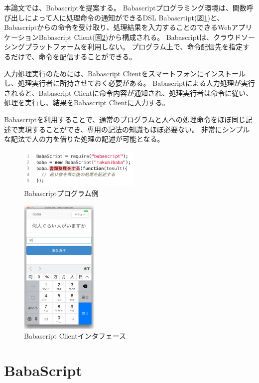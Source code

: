 本論文では、Babascriptを提案する。
Babascriptプログラミング環境は、関数呼び出しによって人に処理命令の通知ができるDSL
Babascrtipt(図\ref{script_01})と、
Babascriptからの命令を受け取り、処理結果を入力することのできるWebアプリケーションBabascript
Client(図\ref{webapp-interface})から構成される。
Babascriptは、クラウドソーシングプラットフォームを利用しない。
プログラム上で、命令配信先を指定するだけで、命令を配信することができる。

人力処理実行のためには、Babascript
Clientをスマートフォンにインストールし、処理実行者に所持させておく必要がある。
Babascriptによる人力処理が実行されると、Babascript
Clientに命令内容が通知され、処理実行者は命令に従い、処理を実行し、結果をBabascript
Clientに入力する。

Babascriptを利用することで、通常のプログラムと人への処理命令をほぼ同じ記述で実現することができ、専用の記法の知識もほぼ必要ない。
非常にシンプルな記法で人の力を借りた処理の記述が可能となる。

\begin{figure}[!h]
  \centering
  \includegraphics[width=220px]{./images/script_01.png}
  \caption{Babascriptプログラム例}
  \label{script_01}
\end{figure}

\begin{figure}[!h]  
  \centering
  \includegraphics[width=140px]{./images/interface.png}
  \caption{Babascript Clientインタフェース}
  \label{webapp-interface}
\end{figure}

\section{BabaScript}\label{babascript}

